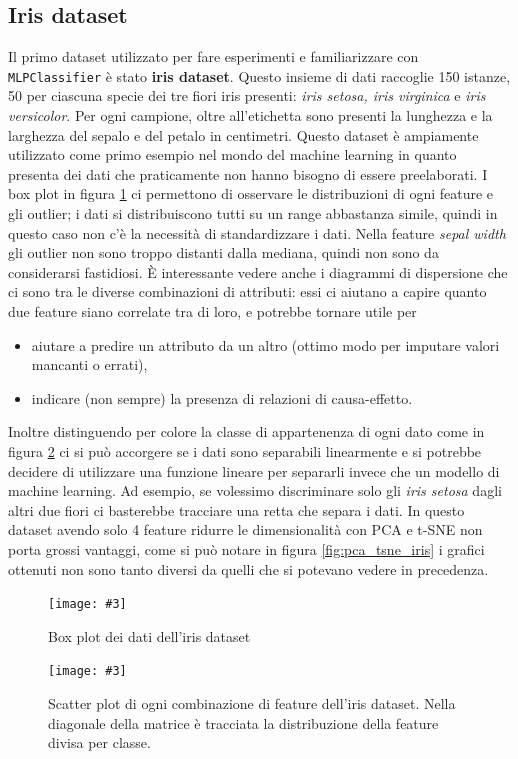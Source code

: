 \documentclass[12pt, twoside, letterpaper]{report}
\newcommand{\img}[4] {
	\begin{figure}
		\centering
		\texttt{[image: \#3]}\\
		\caption{#1}
		\label{fig:#4}
	\end{figure}
}
\begin{document}
		\subsection{Iris dataset}
			Il primo dataset utilizzato per fare esperimenti e familiarizzare con \texttt{MLPClassifier} è stato \textbf{iris dataset}. Questo insieme di dati raccoglie 150 istanze, 50 per ciascuna specie dei tre fiori iris presenti: \textit{iris setosa, iris virginica} e \textit{iris versicolor}. Per ogni campione, oltre all'etichetta sono presenti la lunghezza e la larghezza del sepalo e del petalo in centimetri. Questo dataset è ampiamente utilizzato come primo esempio nel mondo del machine learning in quanto presenta dei dati che praticamente non hanno bisogno di essere preelaborati. I box plot in figura \ref{fig:boxplot_iris} ci permettono di osservare le distribuzioni di ogni feature e gli outlier; i dati si distribuiscono tutti su un range abbastanza simile, quindi in questo caso non c'è la necessità di standardizzare i dati. Nella feature \textit{sepal width} gli outlier non sono troppo distanti dalla mediana, quindi non sono da considerarsi fastidiosi. È interessante vedere anche i diagrammi di dispersione che ci sono tra le diverse combinazioni di attributi: essi ci aiutano a capire quanto due feature siano correlate tra di loro, e potrebbe tornare utile per
			\begin{itemize}
				\item aiutare a predire un attributo da un altro (ottimo modo per imputare valori mancanti o errati),
				\item indicare (non sempre) la presenza di relazioni di causa-effetto.
			\end{itemize}
			Inoltre distinguendo per colore la classe di appartenenza di ogni dato come in figura \ref{fig:scatter_iris}  ci si può accorgere se i dati sono separabili linearmente e si potrebbe decidere di utilizzare una funzione lineare per separarli invece che un modello di machine learning. Ad esempio, se volessimo discriminare solo gli \textit{iris setosa} dagli altri due fiori ci basterebbe tracciare una retta che separa i dati. In questo dataset avendo solo 4 feature ridurre le dimensionalità con PCA e t-SNE non porta grossi vantaggi, come si può notare in figura \ref{fig:pca_tsne_iris} i grafici ottenuti non sono tanto diversi da quelli che si potevano vedere in precedenza.
			
			\img{Box plot dei dati dell'iris dataset}{0.5}{boxplot.png}{boxplot_iris}
			\img{Scatter plot di ogni combinazione di feature dell'iris dataset. Nella diagonale della matrice è tracciata la distribuzione della feature divisa per classe.}{0.6}{scatter.png}{scatter_iris}
			
\end{document}
